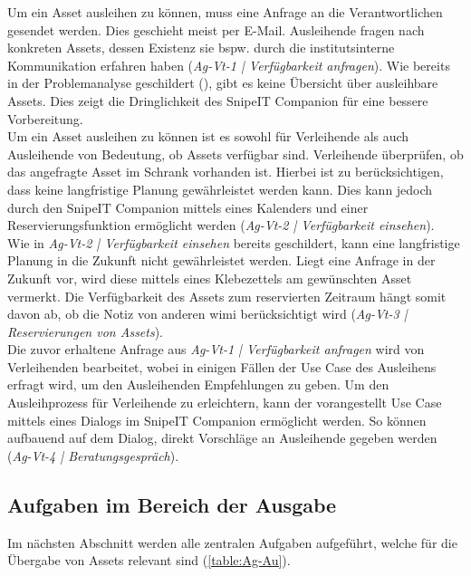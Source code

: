 Um ein Asset ausleihen zu können, muss eine Anfrage an die Verantwortlichen
gesendet werden. Dies geschieht meist per E-Mail. Ausleihende fragen nach
konkreten Assets, dessen Existenz sie bspw. durch die institutsinterne
Kommunikation erfahren haben (\textit{Ag-Vt-1 | Verfügbarkeit anfragen}). Wie
bereits in der Problemanalyse geschildert
(), gibt es keine Übersicht über ausleihbare
Assets. Dies zeigt die Dringlichkeit des SnipeIT Companion für eine bessere
Vorbereitung.\\
Um ein Asset ausleihen zu können ist es sowohl für Verleihende als auch
Ausleihende von Bedeutung, ob Assets verfügbar sind. Verleihende überprüfen, ob
das angefragte Asset im Schrank vorhanden ist. Hierbei ist zu berücksichtigen,
dass keine langfristige Planung gewährleistet werden kann. Dies kann jedoch
durch den SnipeIT Companion mittels eines Kalenders und einer
Reservierungsfunktion ermöglicht werden (\textit{Ag-Vt-2 | Verfügbarkeit
        einsehen}).\\
Wie in \textit{Ag-Vt-2 | Verfügbarkeit einsehen} bereits geschildert, kann eine
langfristige Planung in die Zukunft nicht gewährleistet werden. Liegt eine
Anfrage in der Zukunft vor, wird diese mittels eines Klebezettels am gewünschten
Asset vermerkt. Die Verfügbarkeit des Assets zum reservierten Zeitraum hängt
somit davon ab, ob die Notiz von anderen \ac{wimi} berücksichtigt wird
(\textit{Ag-Vt-3 | Reservierungen von Assets}). \\
Die zuvor erhaltene Anfrage aus \textit{Ag-Vt-1 | Verfügbarkeit anfragen} wird
von Verleihenden bearbeitet, wobei in einigen Fällen der Use Case des
Ausleihens erfragt wird, um den Ausleihenden Empfehlungen zu geben. Um den
Ausleihprozess für Verleihende zu erleichtern, kann der vorangestellt Use Case
mittels eines Dialogs im SnipeIT Companion ermöglicht werden. So können
aufbauend auf dem Dialog, direkt Vorschläge an Ausleihende gegeben werden
(\textit{Ag-Vt-4 | Beratungsgespräch}).


\subsection{Aufgaben im Bereich der Ausgabe}
Im nächsten Abschnitt werden alle zentralen Aufgaben aufgeführt, welche für die
Übergabe von Assets relevant sind (\ref{table:Ag-Au}).

